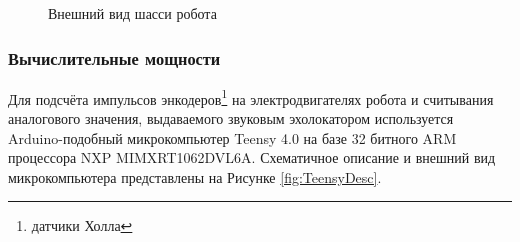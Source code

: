 \documentclass[12pt,a4paper]{scrartcl}
\begin{document}
					\begin{figure}[h]
						\caption{Внешний вид шасси робота}
						\label{fig:RobotChassis}
					\end{figure}				
					
				\subsubsection{Вычислительные мощности}
					Для подсчёта импульсов энкодеров\footnote{датчики Холла} на электродвигателях робота и считывания аналогового значения, выдаваемого звуковым эхолокатором используется Arduino-подобный микрокомпьютер Teensy 4.0 на базе 32 битного ARM процессора NXP MIMXRT1062DVL6A\cite{bib:TeensyDesc}. Схематичное описание и внешний вид микрокомпьютера представлены на Рисунке \ref{fig:TeensyDesc}.
					
\end{document}
